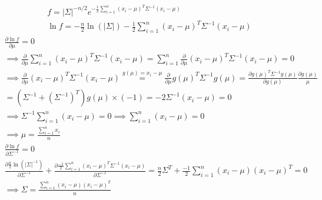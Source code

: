 \\
\begin{gather*}
    f = |\Sigma|^{-n/2} e^{-\frac{1}{2} \sum_{i=1}^n (x_i-\mu)^T \Sigma^{-1} (x_i-\mu)}\\
    \ln f = -\frac{n}{2} \ln (|\Sigma|) -\frac{1}{2} \sum_{i=1}^n (x_i-\mu)^T \Sigma^{-1} (x_i-\mu)
\end{gather*}
\begin{gather*}
    \frac{\partial \ln f}{\partial \mu} = 0\\
    \implies \frac{\partial}{\partial \mu} \sum_{i=1}^n (x_i-\mu)^T \Sigma^{-1} (x_i-\mu) = \sum_{i=1}^n \frac{\partial}{\partial \mu} (x_i-\mu)^T \Sigma^{-1} (x_i-\mu) = 0\\
    \implies \frac{\partial}{\partial \mu} (x_i-\mu)^T \Sigma^{-1} (x_i-\mu) \stackrel{g(\mu) = x_i - \mu}{=} \frac{\partial}{\partial \mu} g(\mu)^T \Sigma^{-1} g(\mu)
    = \frac{\partial g(\mu)^T \Sigma^{-1} g(\mu)}{\partial g(\mu)} \frac{\partial g(\mu)}{\mu}\\
    = (\Sigma^{-1} + (\Sigma^{-1})^T) g(\mu) \times (-1) = -2\Sigma^{-1} (x_i - \mu) = 0\\
    \implies \Sigma^{-1} \sum_{i=1}^n (x_i - \mu) = 0 \implies \sum_{i=1}^n (x_i - \mu) = 0\\
    \implies \mu = \frac{\sum_{i=1}^n x_i}{n}
\end{gather*}
\begin{gather*}
    \frac{\partial \ln f}{\partial \Sigma^{-1}} = 0\\
    \frac{\partial \frac{n}{2} \ln (|\Sigma|^{-1})}{\partial \Sigma^{-1}} + \frac{\partial \frac{-1}{2} \sum_{i=1}^n (x_i-\mu)^T \Sigma^{-1} (x_i-\mu)}{\partial \Sigma^{-1}} =
    \frac{n}{2} \Sigma^T + \frac{-1}{2} \sum_{i=1}^{n} (x_i-\mu) (x_i-\mu)^T = 0\\
    \implies \Sigma = \frac{\sum_{i=1}^{n} (x_i-\mu) (x_i-\mu)^T}{n}
\end{gather*}